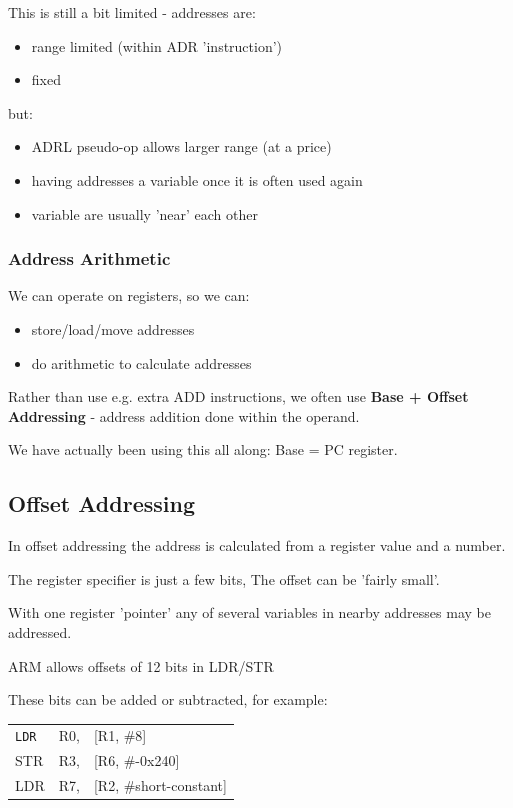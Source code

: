 This is still a bit limited - addresses are:

\begin{itemize}
  \item range limited (within ADR 'instruction')
  \item fixed
\end{itemize}

but:

\begin{itemize}
  \item ADRL pseudo-op allows larger range (at a price)
  \item having addresses a variable once it is often used again
  \item variable are usually 'near' each other
\end{itemize}

\subsubsection{Address Arithmetic}
We can operate on registers, so we can:

\begin{itemize}
  \item store/load/move addresses
  \item do arithmetic to calculate addresses
\end{itemize}

Rather than use e.g. extra ADD instructions, we often use {\bf Base + Offset Addressing} - address addition done within the operand.

We have actually been using this all along: Base = PC register.

\subsection{Offset Addressing}
In offset addressing the address is calculated from a register value and a number.

The register specifier is just a few bits, The offset can be 'fairly small'.

With one register 'pointer' any of several variables in nearby addresses may be addressed.

ARM allows offsets of 12 bits in LDR/STR

These bits can be added or subtracted, for example:

\begin{center}
    \begin{tabular}{l l l}
        {\tt LDR} & R0, & [R1, \#8] \\
        STR & R3, & [R6, \#-0x240]\\
        LDR & R7, & [R2, \#short-constant]
    \end{tabular}
\end{center}

